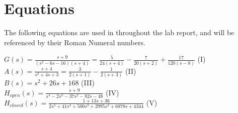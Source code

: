 \documentclass[12pt,a4paper]{article}
\begin{document}
\section{Equations}
The following equations are used in throughout the lab report, and will be referenced by their Roman Numeral numbers.
\begin{center}
    $G(s)=\frac{s+9}{(s^2-6s-16)(s+4)}=\frac{5}{24(s+4)}-\frac{7}{20(s+2)}+\frac{17}{120(s-8)}$ (I)\\
    $A(s)=\frac{s+4}{s^2+4s+3}=\frac{3}{2(s+1)}-\frac{1}{2(s+3)}$ (II)\\
    $B(s)=s^2+26s+168$ (III)\\
    $H_{open}(s)= \frac{s+9}{s^4-2s^3-37s^2-82s-48}$ (IV)\\
    $H_{closed}(s)=\frac{1+13s+36}{2s^5+41s^4+500s^3+2995s^2+6878s+4344}$ (V)
\end{center}
\end{document}
